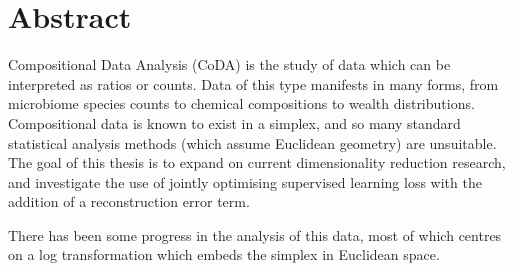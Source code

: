 \chapter*{Abstract}
\vspace{-1em}
  Compositional Data Analysis (CoDA) is the study of data which can be interpreted as ratios or counts. Data of this type manifests in many forms, from microbiome species counts to chemical compositions to wealth distributions. Compositional data is known to exist in a simplex, and so many standard statistical analysis methods (which assume Euclidean geometry) are unsuitable. The goal of this thesis is to expand on current dimensionality reduction research, and investigate the use of jointly optimising supervised learning  loss with the addition of a reconstruction error term. 
  
  There has been some progress in the analysis of this data, most of which centres on a log transformation which embeds the simplex in Euclidean space.  

